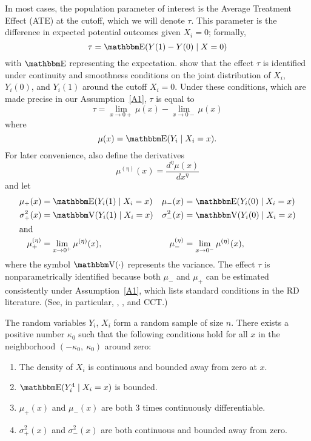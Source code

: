 \documentclass[12pt,fleqn]{article}
\begin{document}
In most cases, the population parameter of interest is the Average Treatment
Effect (ATE) at the cutoff, which we will denote $\tau$. This parameter is the
difference in expected potential outcomes given $X_i = 0$; formally,
\begin{equation*}
  \tau=\E(Y(1)-Y(0) \mid X=0)
\end{equation*}
with $\E$ representing the expectation.
\cite{HTV2001} show that the effect $\tau$ is identified under continuity and
smoothness conditions on the joint distribution of $X_i$, $Y_i(0)$, and $Y_i(1)$
around the cutoff $X_i = 0$. Under these conditions, which are made precise
in our Assumption~\ref{A1}, $\tau$ is equal to
\begin{equation*}
  \tau = \lim_{x \to 0+} \mu(x) - \lim_{x \to 0-} \mu(x)
\end{equation*}
where
\begin{equation*}
  \mu(x)= \E(Y_{i} \mid X_{i}=x).
\end{equation*}
For later convenience, also define the derivatives
\begin{equation*}
  \mu^{(\eta)}(x)=\frac{d^{\eta}\mu(x)}{dx^{\eta}}
\end{equation*}
and let
\begin{align*}
  \mu_{+}(x)
  &= \E( Y_{i}(1) \mid X_{i}=x )
  &\mu_{-}(x)
  &= \E( Y_{i}(0) \mid X_{i}=x ) \\
  \sigma^{2}_{+}(x) &= \V( Y_{i}(1) \mid X_{i}=x )
  &\sigma^{2}_{-}(x)&=\V( Y_{i}(0) \mid X_{i}=x ) \\
\intertext{and}
  \mu^{(\eta)}_{+}
  &= \lim_{x \rightarrow 0^{+}}\mu^{(\eta)}(x),
  &\mu^{(\eta)}_{-}
  &= \lim_{x \rightarrow 0^{-}}\mu^{(\eta)}(x),
\end{align*}
where the symbol $\V(\cdot)$ represents the variance.  The effect $\tau$ is
nonparametrically identified because both $\mu_-$ and $\mu_+$ can be estimated
consistently under Assumption~\ref{A1}, which lists standard conditions in the
RD literature. (See, in particular, \citealp{HTV2001}, \citealp{Porter03}, and
CCT.)

\begin{assumption}\label{A1}
  The random variables $Y_i$, $X_i$ form a random sample of size $n$.
  There exists a positive number $\kappa_0$ such that the following
  conditions hold for all $x$ in the neighborhood $(-\kappa_{0},\ \kappa_{0})$
  around zero:
  \begin{enumerate}
  \item The density of $X_i$ is continuous and bounded away from zero at $x$.
  \item $\E(Y_{i}^{4} \mid X_{i}=x)$ is bounded.
  \item $\mu_+(x)$ and $\mu_-(x)$ are both 3 times continuously differentiable.
  \item $\sigma_+^2(x)$ and $\sigma_-^2(x)$ are both continuous and bounded away
    from zero.
 \end{enumerate}
\end{assumption}
\end{document}
